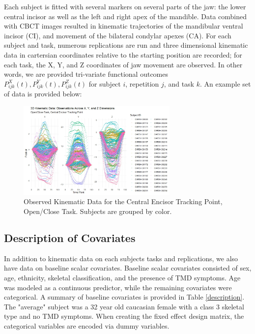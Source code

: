 \documentclass[AMA,Times1COL]{WileyNJDv5} %
\begin{document}
Each subject is fitted with several markers on several parts of the jaw: the lower central incisor as well as the left and right apex of the mandible.  Data combined with CBCT images resulted in kinematic trajectories of the mandibular ventral incisor (CI), and movement of the bilateral condylar apexes (CA).  For each subject and task, numerous replications are run and three dimensional kinematic data in cartersian coordinates relative to the starting position are recorded; for each task, the X, Y, and Z coordinates of jaw movement are observed.  In other words, we are provided tri-variate functional outcomes \(P_{ijk}^X(t), P_{ijk}^Y(t), P_{ijk}^Z(t)\) for subject \(i\), repetition \(j\), and task \(k\).  An example set of data is provided below:

\begin{figure}[h]
    \centering
    \includegraphics[width = 0.7\textwidth]{OC_CI_raw.jpeg}
    \caption{Observed Kinematic Data for the Central Encisor Tracking Point, Open/Close Task.  Subjects are grouped by color.}
    \label{fig:example_dat}
\end{figure}

\subsection{Description of Covariates}
In addition to kinematic data on each subjects tasks and replications, we also have data on baseline scalar covariates.  Baseline scalar covariates consisted of sex, age, ethnicity, skeletal classification, and the presence of TMD symptoms. Age was modeled as a continuous predictor, while the remaining covariates were categorical.  A summary of baseline covariates is provided in Table \ref{description}.  The "average" subject was a 32 year old caucasian female with a class 3 skeletal type and no TMD symptoms.  When creating the fixed effect design matrix, the categorical variables are encoded via dummy variables.  
\end{document}
